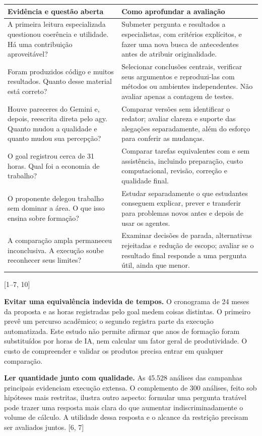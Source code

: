 \documentclass[11pt,a4paper]{article}
\newcommand{\fonte}[1]{{\small\color{navy}[#1]}}
\begin{document}
\begin{tabularx}{\textwidth}{@{}Y Y@{}}
\toprule
\textbf{Evidência e questão aberta} & \textbf{Como aprofundar a avaliação}\\
\midrule
A primeira leitura especializada questionou coerência e utilidade. Há uma contribuição aproveitável? & Submeter pergunta e resultados a especialistas, com critérios explícitos, e fazer uma nova busca de antecedentes antes de atribuir originalidade.\\
Foram produzidos código e muitos resultados. Quanto desse material está correto? & Selecionar conclusões centrais, verificar seus argumentos e reproduzi-las com métodos ou ambientes independentes. Não avaliar apenas a contagem de testes.\\
Houve pareceres do Gemini e, depois, reescrita direta pelo agy. Quanto mudou a qualidade e quanto mudou sua percepção? & Comparar versões sem identificar o redator; avaliar clareza e suporte das alegações separadamente, além do esforço para conferir as mudanças.\\
O goal registrou cerca de 31 horas. Qual foi a economia de trabalho? & Comparar tarefas equivalentes com e sem assistência, incluindo preparação, custo computacional, revisão, correção e qualidade final.\\
O proponente delegou trabalho sem dominar a área. O que isso ensina sobre formação? & Estudar separadamente o que estudantes conseguem explicar, prever e transferir para problemas novos antes e depois de usar os agentes.\\
A comparação ampla permaneceu inconclusiva. A execução soube reconhecer seus limites? & Examinar decisões de parada, alternativas rejeitadas e redução de escopo; avaliar se o resultado final responde a uma pergunta útil, ainda que menor.\\
\bottomrule
\end{tabularx}
\fonte{1--7, 10}

\textbf{Evitar uma equivalência indevida de tempos.} O cronograma de 24 meses da proposta e as horas registradas pelo goal medem coisas distintas. O primeiro prevê um percurso acadêmico; o segundo registra parte da execução automatizada. Este estudo não permite afirmar que anos de formação foram substituídos por horas de IA, nem calcular um fator geral de produtividade. O custo de compreender e validar os produtos precisa entrar em qualquer comparação.

\textbf{Ler quantidade junto com qualidade.} As 45.528 análises das campanhas principais evidenciam execução extensa. O complemento de 300 análises, feito sob hipóteses mais restritas, ilustra outro aspecto: formular uma pergunta tratável pode trazer uma resposta mais clara do que aumentar indiscriminadamente o volume de cálculo. A utilidade dessa resposta e o alcance da restrição precisam ser avaliados juntos. \fonte{6, 7}
\end{document}
